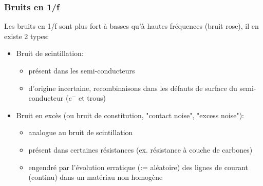 \subsubsection{Bruits en 1/f}
Les bruits en 1/f sont plus fort à basses qu'à hautes fréquences (bruit rose), il en existe 2 types:
\begin{itemize}
	\item Bruit de scintillation:
	\begin{itemize}
		\item présent dans les semi-conducteurs
		\item d'origine incertaine, recombinaisons dans les défauts de surface du semi-conducteur (\(e^-\) et trous)
	\end{itemize}
	\item Bruit en excès (ou bruit de constitution, "contact noise", "excess noise"):
	\begin{itemize}
		\item analogue au bruit de scintillation
		\item présent dans certaines résistances (ex. résistance à couche de carbones)
		\item engendré par l'évolution erratique (:= aléatoire) des lignes de courant (continu) dans un matériau non homogène
	\end{itemize}
\end{itemize}
